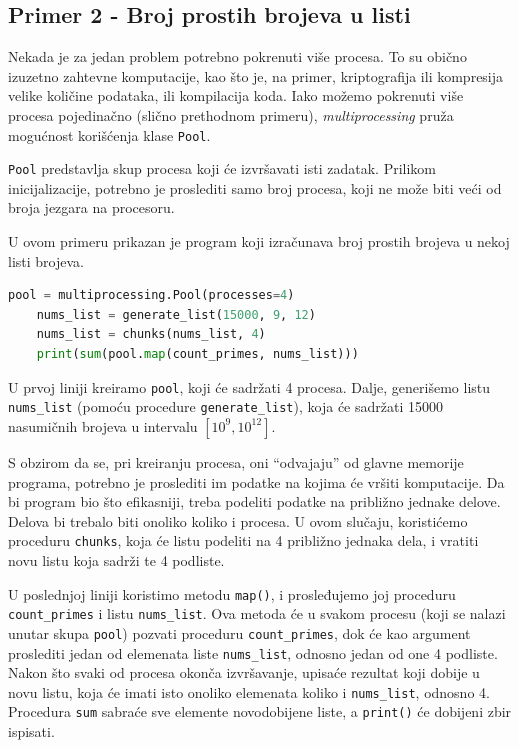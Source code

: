 \documentclass[a4paper]{article}
\begin{document}
    \subsection{Primer 2 - Broj prostih brojeva u listi}
    Nekada je za jedan problem potrebno pokrenuti više procesa. To su obično izuzetno zahtevne komputacije, kao što je, na primer, kriptografija ili kompresija velike količine podataka, ili kompilacija koda. Iako možemo pokrenuti više procesa pojedinačno (slično prethodnom primeru), \emph{multiprocessing} pruža mogućnost korišćenja klase \lstinline{Pool}. 
    \par \lstinline{Pool} predstavlja skup procesa koji će izvršavati isti zadatak. Prilikom inicijalizacije, potrebno je proslediti samo broj procesa, koji ne može biti veći od broja jezgara na procesoru.
    \par U ovom primeru prikazan je program koji izračunava broj prostih brojeva u nekoj listi brojeva.
    \begin{lstlisting}[showstringspaces=false, language=Python]
    pool = multiprocessing.Pool(processes=4)
    nums_list = generate_list(15000, 9, 12)
    nums_list = chunks(nums_list, 4)
    print(sum(pool.map(count_primes, nums_list)))
    \end{lstlisting}
    \par U prvoj liniji kreiramo \lstinline{pool}, koji će sadržati 4 procesa.
    Dalje, generišemo listu \lstinline{nums_list} (pomoću procedure \lstinline{generate_list}), koja će sadržati 15000 nasumičnih brojeva u intervalu $\left [ 10^{9}, 10^{12} \right ]$. 
    \par S obzirom da se, pri kreiranju procesa, oni ``odvajaju'' od glavne memorije programa, potrebno je proslediti im podatke na kojima će vršiti komputacije. Da bi program bio što efikasniji, treba podeliti podatke na približno jednake delove. Delova bi trebalo biti onoliko koliko i procesa.
    U ovom slučaju, koristićemo proceduru \lstinline{chunks}, koja će listu podeliti na 4 približno jednaka dela, i vratiti novu listu koja sadrži te 4 podliste.
    \par U poslednjoj liniji koristimo metodu \lstinline{map()}, i prosleđujemo joj proceduru \lstinline{count_primes} i listu \lstinline{nums_list}. Ova metoda će u svakom procesu (koji se nalazi unutar skupa \lstinline{pool}) pozvati proceduru \lstinline{count_primes}, dok će kao argument proslediti jedan od elemenata liste \lstinline{nums_list}, odnosno jedan od one 4 podliste. Nakon što svaki od procesa okonča izvršavanje, upisaće rezultat koji dobije u novu listu, koja će imati isto onoliko elemenata koliko i \lstinline{nums_list}, odnosno 4. Procedura \lstinline{sum} sabraće sve elemente novodobijene liste, a \lstinline{print()} će dobijeni zbir ispisati.
\end{document}
